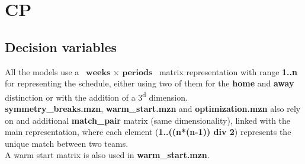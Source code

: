 \documentclass{article}
\begin{document}
\section{CP}

\subsection{Decision variables}
All the models use a $\textbf{ weeks }\times\textbf{ periods }$ matrix representation with range \textbf{1..n} for representing the schedule, either using two of them for the \textbf{home} and \textbf{away} distinction or with the addition of a 3\textsuperscript{d} dimension.\\
 \textbf{symmetry\_breaks.mzn}, \textbf{warm\_start.mzn} and \textbf{optimization.mzn} also rely on and additional \textbf{match\_pair} matrix (same dimensionality), linked with the main representation, where each element (\textbf{1..((n*(n-1)) div 2}) represents the unique match between two teams.\\
A warm start matrix is also used in \textbf{warm\_start.mzn}.  
\end{document}
